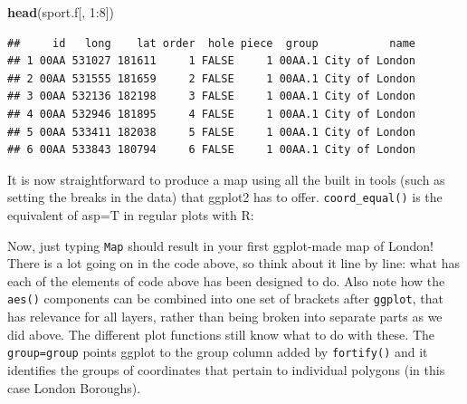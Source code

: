 \documentclass[]{article}
\newenvironment{Shaded}{}{}
\newcommand{\KeywordTok}[1]{\textcolor[rgb]{0.00,0.44,0.13}{\textbf{{#1}}}}
\newcommand{\DataTypeTok}[1]{\textcolor[rgb]{0.56,0.13,0.00}{{#1}}}
\newcommand{\DecValTok}[1]{\textcolor[rgb]{0.25,0.63,0.44}{{#1}}}
\newcommand{\StringTok}[1]{\textcolor[rgb]{0.25,0.44,0.63}{{#1}}}
\newcommand{\NormalTok}[1]{{#1}}
\begin{document}
\begin{Shaded}
\begin{Highlighting}[]
\KeywordTok{head}\NormalTok{(sport.f[, }\DecValTok{1}\NormalTok{:}\DecValTok{8}\NormalTok{])}
\end{Highlighting}
\end{Shaded}
\begin{verbatim}
##     id   long    lat order  hole piece  group           name
## 1 00AA 531027 181611     1 FALSE     1 00AA.1 City of London
## 2 00AA 531555 181659     2 FALSE     1 00AA.1 City of London
## 3 00AA 532136 182198     3 FALSE     1 00AA.1 City of London
## 4 00AA 532946 181895     4 FALSE     1 00AA.1 City of London
## 5 00AA 533411 182038     5 FALSE     1 00AA.1 City of London
## 6 00AA 533843 180794     6 FALSE     1 00AA.1 City of London
\end{verbatim}
It is now straightforward to produce a map using all the built in tools
(such as setting the breaks in the data) that ggplot2 has to offer.
\texttt{coord\_equal()} is the equivalent of asp=T in regular plots with
R:

\begin{Shaded}
\end{Shaded}
Now, just typing \texttt{Map} should result in your first ggplot-made
map of London! There is a lot going on in the code above, so think about
it line by line: what has each of the elements of code above has been
designed to do. Also note how the \texttt{aes()} components can be
combined into one set of brackets after \texttt{ggplot}, that has
relevance for all layers, rather than being broken into separate parts
as we did above. The different plot functions still know what to do with
these. The \texttt{group=group} points ggplot to the group column added
by \texttt{fortify()} and it identifies the groups of coordinates that
pertain to individual polygons (in this case London Boroughs).
\end{document}
